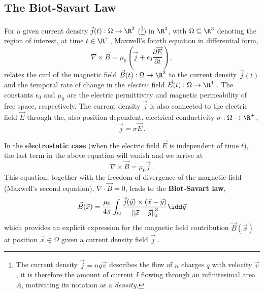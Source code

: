 \documentclass[10pt]{article}
\renewcommand{\norm}[1]{\left\lVert#1\right\rVert_{\scriptscriptstyle 2}}
\begin{document}
  \subsection{The Biot-Savart Law}
  For a given current density $\vec{j}(t): \Omega \to \R^3$ (\footnote{
    The current density $\vec{j} = nq\vec{v}$ describes the flow of $n$ charges $q$ with velocity $\vec{v}$, it is therefore the amount of current $I$ flowing through an infinitesimal area $A$, motivating its notation as a \textit{density}.
  }) in $\R^3$, with $\Omega \subseteq \R^3$ denoting the region of interest, at time $t \in \R^+$, Maxwell's fourth equation in differential form,
  \begin{equation*}
    \nabla \times \vec{B} = \mu_0 \left(\vec{j} + \epsilon_0 \frac{\partial \vec{E}}{\partial t}\right)\,,
    \label{eq:maxwell-4}
  \end{equation*}
  relates the curl of the magnetic field $\vec{B}(t): \Omega \to \R^3$ to the current density $\vec{j}(t)$ and the temporal rate of change in the \textit{electric} field $\vec{E}(t): \Omega \to \R^3$ \parencite[chapter~6, section~1]{1999-jackson-electrodynamics}.
  The constants $\epsilon_0$ and $\mu_0$ are the electric permittivity and magnetic permeability of free space, respectively.
  The current density $\vec{j}$ is also connected to the electric field $\vec{E}$ through the, also position-dependent, electrical conductivity $\sigma: \Omega \to \R^+$,
  $$\vec{j} = \sigma \vec{E}\,.$$

  In the \textbf{electrostatic case} (when the electric field $\vec{E}$ is independent of time $t$), the last term in the above equation will vanish and we arrive at
  \begin{equation}
    \nabla \times \vec{B} = \mu_0 \vec{j}\,.
    \label{eq:maxwell-4-electrostatic}
  \end{equation}
  This equation, together with the freedom of divergence of the magnetic field (Maxwell's second equation), $\nabla \cdot \vec{B} = 0$, leads to the \textbf{Biot-Savart law},
  \begin{equation}
    \vec{B}(\vec{x})
    = \frac{\mu_0}{4\pi} \int_\Omega \frac{\vec{j}(\vec{y}) \times (\vec{x} - \vec{y})}{\norm{\vec{x} - \vec{y}}^3} \idd\vec{y}
    \label{eq:biot-savart}
  \end{equation}
  which provides an explicit expression for the magnetic field contribution $\vec{B}(\vec{x})$ at position $\vec{x} \in \Omega$ given a current density field $\vec{j}$ \parencite[chapter~5, section~2]{1999-jackson-electrodynamics}.
\end{document}
